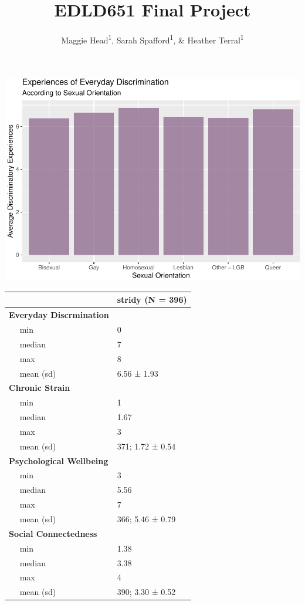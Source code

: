 \documentclass[
  english,
  man,floatsintext]{apa6}
\title{EDLD651 Final Project}
\author{Maggie Head\textsuperscript{1}, Sarah Spafford\textsuperscript{1}, \& Heather Terral\textsuperscript{1}}
\date{}
\affiliation{\vspace{0.5cm}\textsuperscript{1} University of Oregon}
\begin{document}
\maketitle

\includegraphics{prep_script_files/figure-latex/mean plot-1.pdf}

\begin{longtable}[]{@{}ll@{}}
\toprule
& stridy (N = 396)\tabularnewline
\midrule
\endhead
\textbf{Everyday Discrmination} & ~~\tabularnewline
~~ min & 0\tabularnewline
~~ median & 7\tabularnewline
~~ max & 8\tabularnewline
~~ mean (sd) & 6.56 ± 1.93\tabularnewline
\textbf{Chronic Strain} & ~~\tabularnewline
~~ min & 1\tabularnewline
~~ median & 1.67\tabularnewline
~~ max & 3\tabularnewline
~~ mean (sd) & 371; 1.72 ± 0.54\tabularnewline
\textbf{Psychological Wellbeing} & ~~\tabularnewline
~~ min & 3\tabularnewline
~~ median & 5.56\tabularnewline
~~ max & 7\tabularnewline
~~ mean (sd) & 366; 5.46 ± 0.79\tabularnewline
\textbf{Social Connectedness} & ~~\tabularnewline
~~ min & 1.38\tabularnewline
~~ median & 3.38\tabularnewline
~~ max & 4\tabularnewline
~~ mean (sd) & 390; 3.30 ± 0.52\tabularnewline
\bottomrule
\end{longtable}
\end{document}
